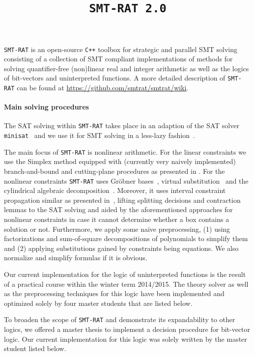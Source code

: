 \documentclass{article}
\title{\texttt{SMT-RAT 2.0}}
\begin{document}
\maketitle

\texttt{SMT-RAT} is an open-source \texttt{C++} toolbox for strategic and parallel SMT solving
consisting of a collection of SMT compliant implementations of methods for
solving quantifier-free (non)linear real and integer arithmetic as well as
the logics of bit-vectors and uninterpreted functions. A more detailed description of \texttt{SMT-RAT} can be found at \href{https://github.com/smtrat/smtrat/wiki}{\color{blue}https://github.com/smtrat/smtrat/wiki}.

\paragraph{Main solving procedures}

The SAT solving within \texttt{SMT-RAT} takes place in an adaption of the SAT solver \texttt{minisat}~\cite{minisat} and we use it for SMT solving in a less-lazy fashion~\cite{sebastiani2007lazy}.

The main focus of \texttt{SMT-RAT} is nonlinear arithmetic. For the linear constraints we use the Simplex method equipped with (currently very naively implemented) branch-and-bound and cutting-plane procedures as presented in \cite{DM06}. For the nonlinear constraints \texttt{SMT-RAT} uses Gr\"obner bases~\cite{JLCA_CAI13}, virtual substitution~\cite{Article_Corzilius_FCT2011} and the cylindrical algebraic decomposition~\cite{Article_Loup_TubeCAD}. Moreover, it uses interval constraint propagation similar as presented in~\cite{GGIGSC10}, lifting splitting decisions and contraction lemmas to the SAT solving and aided by the aforementioned approaches for nonlinear constraints in case it cannot determine whether a box contains a solution or not. Furthermore, we apply some naive preprocessing, (1) using factorizations and sum-of-square decompositions of polynomials to simplify them and (2) applying substitutions gained by constraints being equations. We also normalize and simplify formulas if it is obvious.

Our current implementation for the logic of uninterpreted functions is the
result of a practical course within the winter term 2014/2015. The theory
solver as well as the preprocessing techniques for this logic have been
implemented and optimized solely by four master students that are listed
below.

To broaden the scope of \texttt{SMT-RAT} and demonstrate its expandability to other
logics, we offered a master thesis to implement a decision procedure for
bit-vector logic. Our current implementation for this logic was solely
written by the master student listed below.
\end{document}
